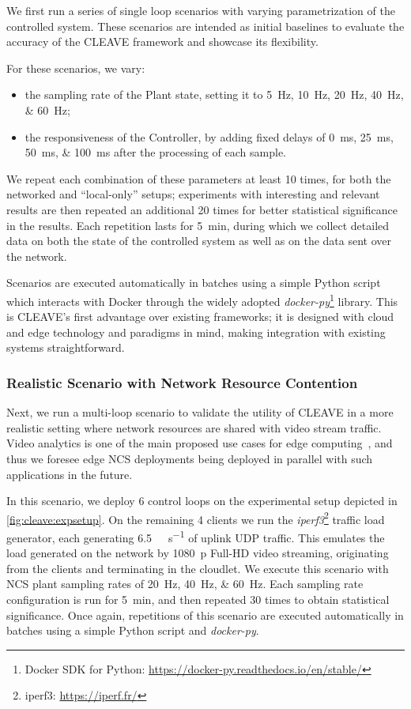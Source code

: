 We first run a series of single loop scenarios with varying parametrization of the controlled system.
These scenarios are intended as initial baselines to evaluate the accuracy of the \ac{CLEAVE} framework and showcase its flexibility.

For these scenarios, we vary:
\begin{itemize}
    \item the sampling rate of the Plant state, setting it to \SIlist[list-final-separator={, or }]{5;10;20;40;60}{\hertz};
    \item the responsiveness of the Controller, by adding fixed delays of  \SIlist[list-final-separator={, or }]{0;25;50;100}{\milli\second} after the processing of each sample.
\end{itemize}

We repeat each combination of these parameters at least \num{10} times, for both the networked and ``local-only'' setups; experiments with interesting and relevant results are then repeated an additional \num{20} times for better statistical significance in the results.
Each repetition lasts for \SI{5}{\minute}, during which we collect detailed data on both the state of the controlled system as well as on the data sent over the network.

Scenarios are executed automatically in batches using a simple Python script which interacts with Docker through the widely adopted \emph{docker-py}\footnote{Docker SDK for Python: \url{https://docker-py.readthedocs.io/en/stable/}} library.
This is \ac{CLEAVE}'s first advantage over existing frameworks; it is designed with cloud and edge technology and paradigms in mind, making integration with existing systems straightforward.

\subsubsection{Realistic Scenario with Network Resource Contention}

Next, we run a multi-loop scenario to validate the utility of \ac{CLEAVE} in a more realistic setting where network resources are shared with video stream traffic.
Video analytics is one of the main proposed use cases for edge computing~\cite{Ananthanarayanan2017Analytics,Yi2017Analytics,Wang2018Analytics}, and thus we foresee edge \ac{NCS} deployments being deployed in parallel with such applications in the future.

In this scenario, we deploy \num{6} control loops on the experimental setup depicted in \cref{fig:cleave:expsetup}.
On the remaining \num{4} clients we run the \emph{iperf3}\footnote{iperf3: \url{https://iperf.fr/}} traffic load generator, each generating \SI[per-mode=symbol]{6.5}{\mega\bit\per\second} of uplink \ac{UDP} traffic.
This emulates the load generated on the network by \SI{1080}{p} Full-HD video streaming, originating from the clients and terminating in the cloudlet.
We execute this scenario with \ac{NCS} plant sampling rates of \SIlist{20;40;60}{\hertz}.
Each sampling rate configuration is run for \SI{5}{\minute}, and then repeated \num{30} times to obtain statistical significance.
Once again, repetitions of this scenario are executed automatically in batches using a simple Python script and \emph{docker-py}.

